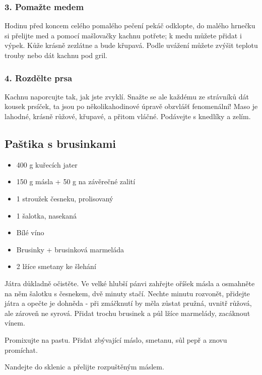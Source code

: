 \documentclass[10pt,a4paper]{article}
\newenvironment{myitemize}
{ \begin{itemize}
    \setlength{\itemsep}{0pt}
    \setlength{\parskip}{0pt}
    \setlength{\parsep}{0pt}     }
{ \end{itemize}                  }
\begin{document}
\subsubsection*{3. Pomažte medem }
 Hodinu před koncem celého pomalého pečení pekáč odklopte, do malého hrnečku si přelijte med a pomocí mašlovačky kachnu
 potřete; k medu můžete přidat i výpek. Kůže krásně zezlátne a bude křupavá. Podle uvážení můžete zvýšit teplotu trouby nebo dát kachnu pod gril.

\subsubsection*{4. Rozdělte prsa} 
 Kachnu naporcujte tak, jak jste zvyklí. Snažte se ale každému ze strávníků dát kousek prsíček, ta jsou po několikahodinové úpravě
 obzvlášť fenomenální! Maso je lahodné, krásně růžové, křupavé, a přitom vláčné. Podávejte s knedlíky a zelím.
\subsection{Paštika s brusinkami}
\begin{minipage}[t]{0,5\textwidth}
\begin{myitemize} 
\item 400 g kuřecích jater
\item 150 g másla + 50 g na závěrečné zalití
\item 1 stroužek česneku, prolisovaný
\item 1 šalotka, nasekaná
\item Bílé víno
\item Brusinky + brusinková marmeláda
\item 2 lžíce smetany ke šlehání
\end{myitemize}
\end{minipage}
\begin{minipage}[t]{0,5\textwidth}
Játra důkladně očistěte. Ve velké hlubší pánvi zahřejte oříšek másla a osmahněte na něm šalotku s česnekem, dvě minuty stačí. Nechte minutu rozvonět, přidejte játra a opečte je dohněda - při zmáčknutí by měla zůstat pružná, uvnitř růžová, ale zároveň ne syrová. Přidat trochu brusinek a půl lžíce marmelády, zacáknout vínem.

Promixujte na pastu. Přidat zbývající máslo, smetanu, sůl pepř a znovu promíchat.

Nandejte do sklenic a přelijte rozpuštěným máslem.
\end{minipage}
\end{document}
